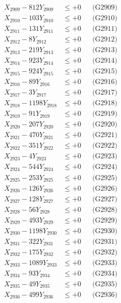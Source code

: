 \documentclass[a4paper,10pt]{article}
\begin{document}
{\begin{align}
X_{2909} - 812Y_{2909} &\leq +0 && \text{(G2909)} \\
X_{2910} - 103Y_{2910} &\leq +0 && \text{(G2910)} \\
\allowbreak
X_{2911} - 131Y_{2911} &\leq +0 && \text{(G2911)} \\
X_{2912} - 8Y_{2912} &\leq +0 && \text{(G2912)} \\
X_{2913} - 219Y_{2913} &\leq +0 && \text{(G2913)} \\
X_{2914} - 923Y_{2914} &\leq +0 && \text{(G2914)} \\
X_{2915} - 924Y_{2915} &\leq +0 && \text{(G2915)} \\
X_{2916} - 89Y_{2916} &\leq +0 && \text{(G2916)} \\
X_{2917} - 3Y_{2917} &\leq +0 && \text{(G2917)} \\
X_{2918} - 1198Y_{2918} &\leq +0 && \text{(G2918)} \\
X_{2919} - 91Y_{2919} &\leq +0 && \text{(G2919)} \\
X_{2920} - 207Y_{2920} &\leq +0 && \text{(G2920)} \\
\allowbreak
X_{2921} - 470Y_{2921} &\leq +0 && \text{(G2921)} \\
X_{2922} - 351Y_{2922} &\leq +0 && \text{(G2922)} \\
X_{2923} - 4Y_{2923} &\leq +0 && \text{(G2923)} \\
X_{2924} - 544Y_{2924} &\leq +0 && \text{(G2924)} \\
X_{2925} - 253Y_{2925} &\leq +0 && \text{(G2925)} \\
X_{2926} - 126Y_{2926} &\leq +0 && \text{(G2926)} \\
X_{2927} - 128Y_{2927} &\leq +0 && \text{(G2927)} \\
X_{2928} - 56Y_{2928} &\leq +0 && \text{(G2928)} \\
X_{2929} - 493Y_{2929} &\leq +0 && \text{(G2929)} \\
X_{2930} - 1198Y_{2930} &\leq +0 && \text{(G2930)} \\
\allowbreak
X_{2931} - 322Y_{2931} &\leq +0 && \text{(G2931)} \\
X_{2932} - 175Y_{2932} &\leq +0 && \text{(G2932)} \\
X_{2933} - 1089Y_{2933} &\leq +0 && \text{(G2933)} \\
X_{2934} - 93Y_{2934} &\leq +0 && \text{(G2934)} \\
X_{2935} - 49Y_{2935} &\leq +0 && \text{(G2935)} \\
X_{2936} - 499Y_{2936} &\leq +0 && \text{(G2936)} \\

\end{align}}
\end{document}
